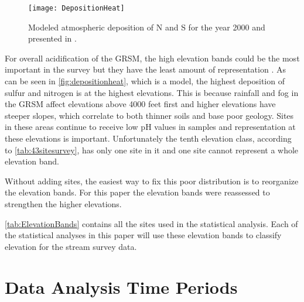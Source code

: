 \begin{figure}[h!]
  \centering
  \texttt{[image: DepositionHeat]}\\
  \caption{ Modeled atmospheric deposition of N and S for the year 2000 and presented in \citet{weathers2006}.}\label{fig:depositionheat}
\end{figure}

For overall acidification of the GRSM, the high elevation bands could be the most important in the survey but they have the least amount of representation \citep{cai2013}.
As can be seen in \autoref{fig:depositionheat}, which is a model, the highest deposition of sulfur and nitrogen is at the highest elevations.
This is because rainfall and fog in the GRSM affect elevations above 4000 feet first and higher elevations have steeper slopes, which correlate to both thinner soils and base poor geology.  
Sites in these areas continue to receive low pH values in samples and representation at these elevations is important.
Unfortunately the tenth elevation class, according to \autoref{tab:43sitesurvey}, has only one site in it and one site cannot represent a whole elevation band.

Without adding sites, the easiest way to fix this poor distribution is to reorganize the elevation bands. 
For this paper the elevation bands were reassessed to strengthen the higher elevations.



\autoref{tab:ElevationBands} contains all the sites used in the statistical analysis.
Each of the statistical analyses in this paper will use these elevation bands to classify elevation for the stream survey data.

\section{Data Analysis Time Periods}


